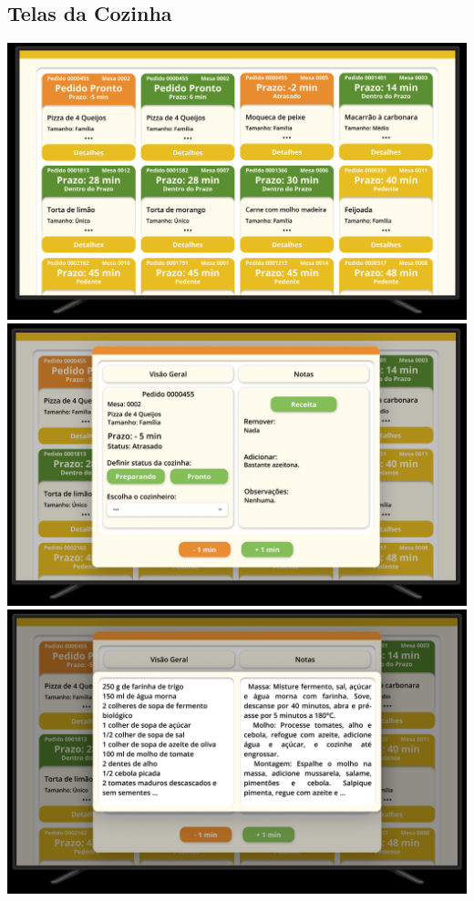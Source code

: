 \subsection{Telas da Cozinha}
\begin{center}
    \includegraphics[width=1\textwidth]{imagens-template/Layout_Cozinha_2622.png} 
    \includegraphics[width=1\textwidth]{imagens-template/Layout_Cozinha_2618.png} 
    \includegraphics[width=1\textwidth]{imagens-template/Layout_Cozinha_2610.png} 
\end{center}